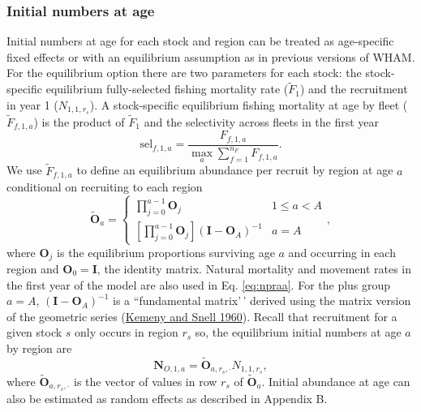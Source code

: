 \documentclass[
]{article}
\begin{document}
\hypertarget{initial-numbers-at-age}{%
\subsubsection*{Initial numbers at age}\label{initial-numbers-at-age}}

Initial numbers at age for each stock and region can be treated as age-specific fixed effects or with an equilibrium assumption as in previous versions of WHAM. For the equilibrium option there are two parameters for each stock: the stock-specific equilibrium fully-selected fishing mortality rate (\(\widetilde{F}_1\)) and the recruitment in year 1 (\(N_{1,1,r_s}\)). A stock-specific equilibrium fishing mortality at age by fleet (\(\widetilde{F}_{f,1,a}\)) is the product of \(\widetilde{F}_1\) and the selectivity across fleets in the first year
\begin{equation*}
  \text{sel}_{f,1,a} = \frac{F_{f,1,a}}{\max_a \sum_{f=1}^{n_F} F_{f,1,a}}.
\end{equation*}
We use \(\widetilde{F}_{f,1,a}\) to define an equilibrium abundance per recruit by region at age \(a\) conditional on recruiting to each region
\begin{equation}\label{eq:npraa}
 \widetilde{\mathbf{O}}_{a} = \left\{
 \begin{array}{ll}
\prod^{a-1}_{j=0}\mathbf{O}_{j}  & 1\leq a<A\\
\left[\prod^{a-1}_{j=0}\mathbf{O}_{j}\right] \left(\mathbf{I} - \mathbf{O}_{A}\right)^{-1} & a = A
 \end{array},
\right.
\end{equation}
where \(\mathbf{O}_{j}\) is the equilibrium proportions surviving age \(a\) and occurring in each region and \(\mathbf{O}_{0} = \mathbf{I}\), the identity matrix. Natural mortality and movement rates in the first year of the model are also used in Eq. \ref{eq:npraa}. For the plus group \(a=A\), \(\left(\mathbf{I} - \mathbf{O}_{A}\right)^{-1}\) is a ``fundamental matrix'\,' derived using the matrix version of the geometric series (\protect\hyperlink{ref-kemenysnell60}{Kemeny and Snell 1960}). Recall that recruitment for a given stock \(s\) only occurs in region \(r_s\) so, the equilibrium initial numbers at age \(a\) by region are
\[\mathbf{N}_{O,1,a} = \widetilde{\mathbf{O}}_{a,r_s,\cdot} N_{1,1,r_s},\]
where \(\widetilde{\mathbf{O}}_{a,r_s,\cdot}\) is the vector of values in row \(r_s\) of \(\widetilde{\mathbf{O}}_{a}\). Initial abundance at age can also be estimated as random effects as described in Appendix B.
\end{document}
